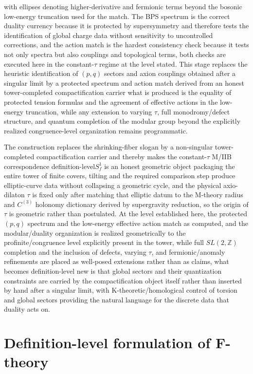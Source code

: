 \documentclass[11pt]{article}
\theoremstyle{remark}
\newcommand{\Z}{\mathbb{Z}}
\begin{document}
with ellipses denoting higher-derivative and fermionic terms beyond the bosonic low-energy truncation used for the match. The BPS spectrum is the correct duality currency because it is protected by supersymmetry and therefore tests the identification of global charge data without sensitivity to uncontrolled corrections, and the action match is the hardest consistency check because it tests not only spectra but also couplings and topological terms, both checks are executed here in the constant-\(\tau\) regime at the level stated. This stage replaces the heuristic identification of \((p,q)\) sectors and axion couplings obtained after a singular limit by a protected spectrum and action match derived from an honest tower-completed compactification carrier what is produced is the equality of protected tension formulas and the agreement of effective actions in the low-energy truncation, while any extension to varying \(\tau\), full monodromy/defect structure, and quantum completion of the modular group beyond the explicitly realized congruence-level organization remains programmatic.

The construction replaces the shrinking-fiber slogan by a non-singular tower-completed compactification carrier and thereby makes the constant-\(\tau\) M/IIB correspondence definition-level\:\(S_f^{1}\) is an honest geometric object packaging the entire tower of finite covers, tilting and the required comparison step produce elliptic-curve data without collapsing a geometric cycle, and the physical axio-dilaton \(\tau\) is fixed only after matching that elliptic datum to the M-theory radius and \(C^{(3)}\) holonomy dictionary derived by supergravity reduction, so the origin of \(\tau\) is geometric rather than postulated. At the level established here, the protected \((p,q)\) spectrum and the low-energy effective action match as computed, and the modular/duality organization is realized geometrically to the profinite/congruence level explicitly present in the tower, while full \(SL(2,\Z)\) completion and the inclusion of defects, varying \(\tau\), and fermionic/anomaly refinements are placed as well-posed extensions rather than as claims, what becomes definition-level new is that global sectors and their quantization constraints are carried by the compactification object itself rather than inserted by hand after a singular limit, with K-theoretic/homological control of torsion and global sectors providing the natural language for the discrete data that duality acts on.

\section{Definition-level formulation of F-theory}\label{sec:results}
\end{document}
